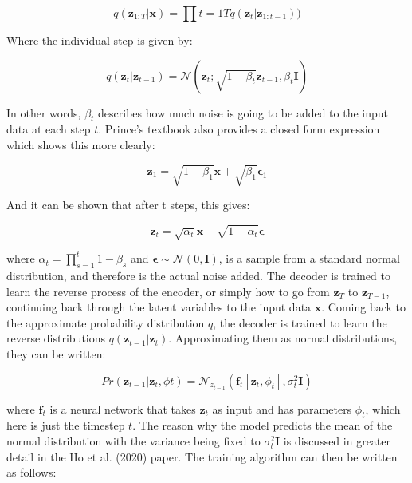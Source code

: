 \documentclass[12pt]{report} %
\begin{document}
\begin{equation}
q(\mathbf{z}_{1:T}|\mathbf{x}) = \prod{t=1}{T}q(\mathbf{z}_{t}|\mathbf{z}_{1:t-1}))
\end{equation}

Where the individual step is given by:

\begin{equation}
  q(\mathbf{z}_{t}|\mathbf{z}_{t-1}) = \mathcal{N}(\mathbf{z}_{t}; \sqrt{1 - \beta_{t}}\mathbf{z}_{t-1}, \beta_{t}\mathbf{I})
\end{equation}

In other words, $\beta_{t}$ describes how much noise is going to be added to the input data at each step $t$. Prince's textbook also provides a closed form expression which shows this more clearly\cite{prince2023understanding}:

\begin{equation}
  \mathbf{z}_{1} = \sqrt{1 - \beta_{1}}\mathbf{x} + \sqrt{\beta_{1}}\mathbf{\epsilon}_{1}
\end{equation}

And it can be shown that after t steps, this gives:

\begin{equation}
  \mathbf{z}_{t} = \sqrt{\alpha_{t}}\mathbf{x} + \sqrt{1 - \alpha_{t}}\mathbf{\epsilon}
\end{equation}

where $\alpha_{t} = \prod_{s=1}^{t} 1 - \beta_{s}$ and $\mathbf{\epsilon} \sim \mathcal{N}(0, \mathbf{I})$, is a sample from a standard normal distribution, and therefore is the actual noise added. The decoder is trained to learn the reverse process of the encoder, or simply how to go from $\mathbf{z}_{T}$ to $\mathbf{z}_{T-1}$, continuing back through the latent variables to the input data $\mathbf{x}$. Coming back to the approximate probability distribution $q$, the decoder is trained to learn the reverse distributions $q(\mathbf{z}_{t-1}|\mathbf{z}_{t})$. Approximating them as normal distributions, they can be written:

\begin{equation}
  Pr(\mathbf{z}_{t-1}|\mathbf{z}_{t}, \phi{t}) = \mathcal{N}_{z_{t-1}}(\mathbf{f}_{t}[\mathbf{z}_{t}, \phi_{t}], \sigma_{t}^{2}\mathbf{I})
\end{equation}

where $\mathbf{f}_{t}$ is a neural network that takes $\mathbf{z}_{t}$ as input and has parameters $\phi_{t}$, which here is just the timestep $t$. The reason why the model predicts the mean of the normal distribution with the variance being fixed to $\sigma_{t}^{2}\mathbf{I}$ is discussed in greater detail in the Ho et al. (2020) paper\cite{ho2020denoising}. The training algorithm can then be written as follows:
\end{document}
